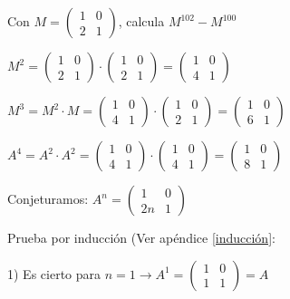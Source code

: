 \begin{ejre}
Con $M=\left( \begin{matrix} 1&0\\2&1 \end{matrix} \right)$, calcula $M^{102}-M^{100}$
\end{ejre}
\begin{proofw}\renewcommand{\qedsymbol}{$\diamond$}

\noindent $M^2=\left( \begin{matrix} 1&0\\2&1 \end{matrix} \right)\cdot \left( \begin{matrix} 1&0\\2&1 \end{matrix} \right)= \left( \begin{matrix} 1&0\\4&1 \end{matrix} \right)$

\noindent $M^3=M^2\cdot M= \left( \begin{matrix} 1&0\\4&1 \end{matrix} \right) \cdot \left( \begin{matrix} 1&0\\2&1 \end{matrix} \right)=\left( \begin{matrix} 1&0\\6&1 \end{matrix} \right)$

\noindent $A^4=A^2\cdot A^2=\left( \begin{matrix} 1&0\\4&1 \end{matrix} \right) \cdot \left( \begin{matrix} 1&0\\4&1 \end{matrix} \right)=\left( \begin{matrix} 1&0\\8&1 \end{matrix} \right)$

Conjeturamos:  $A^n=\left( \begin{matrix} 1&0\\2n&1 \end{matrix} \right)$

\noindent \footnotesize{\textcolor{gris}{ Prueba por inducción (Ver apéndice \ref{inducción}:}}

\noindent \footnotesize{\textcolor{gris}{1) Es cierto para $n=1 \to A^1=\left( \begin{matrix} 1&0\\1&1 \end{matrix} \right)=A$}}


\end{proofw}
